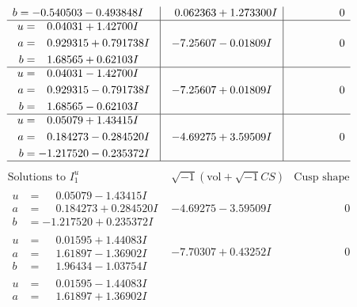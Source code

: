 \documentclass[1p]{elsarticle_modified}
\theoremstyle{definition}
\newcommand{\I}{\sqrt{-1}}
\begin{document}
$$\begin{array}{c|c|c}
\begin{aligned}
b &= -0.540503 - 0.493848 I\end{aligned}
 & \phantom{-}0.062363 + 1.273300 I & \phantom{-0.000000 } 0 \\ \hline\begin{aligned}
u &= \phantom{-}0.04031 + 1.42700 I \\
a &= \phantom{-}0.929315 + 0.791738 I \\
b &= \phantom{-}1.68565 + 0.62103 I\end{aligned}
 & -7.25607 - 0.01809 I & \phantom{-0.000000 } 0 \\ \hline\begin{aligned}
u &= \phantom{-}0.04031 - 1.42700 I \\
a &= \phantom{-}0.929315 - 0.791738 I \\
b &= \phantom{-}1.68565 - 0.62103 I\end{aligned}
 & -7.25607 + 0.01809 I & \phantom{-0.000000 } 0 \\ \hline\begin{aligned}
u &= \phantom{-}0.05079 + 1.43415 I \\
a &= \phantom{-}0.184273 - 0.284520 I \\
b &= -1.217520 - 0.235372 I\end{aligned}
 & -4.69275 + 3.59509 I & \phantom{-0.000000 } 0\\
 \hline 
 \end{array}$$\newpage$$\begin{array}{c|c|c}  
\text{Solutions to }I^u_{1}& \I (\text{vol} + \sqrt{-1}CS) & \text{Cusp shape}\\
 \hline 
\begin{aligned}
u &= \phantom{-}0.05079 - 1.43415 I \\
a &= \phantom{-}0.184273 + 0.284520 I \\
b &= -1.217520 + 0.235372 I\end{aligned}
 & -4.69275 - 3.59509 I & \phantom{-0.000000 } 0 \\ \hline\begin{aligned}
u &= \phantom{-}0.01595 + 1.44083 I \\
a &= \phantom{-}1.61897 - 1.36902 I \\
b &= \phantom{-}1.96434 - 1.03754 I\end{aligned}
 & -7.70307 + 0.43252 I & \phantom{-0.000000 } 0 \\ \hline\begin{aligned}
u &= \phantom{-}0.01595 - 1.44083 I \\
a &= \phantom{-}1.61897 + 1.36902 I \\

\end{aligned}
\end{array}$$
\end{document}
